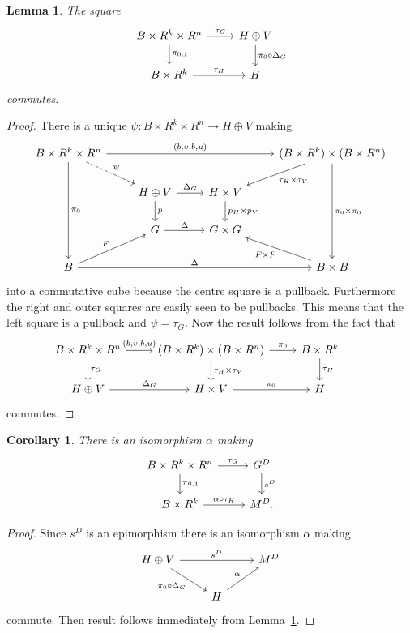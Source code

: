 \documentclass[pdftex]{sigma}
\numberwithin{equation}{section}
\newtheorem{Corollary}[Theorem]{Corollary}
\newtheorem{Lemma}[Theorem]{Lemma}
\begin{document}
\begin{Lemma}\label{lem:split-s}
The square
\begin{equation*}\begin{tikzcd}
B\times R^k \times R^n \rar{\tau_G} \dar{\pi_{0,1}} & H\oplus V \dar{\pi_0\circ\Delta_G}\\
B\times R^k \rar{\tau_H} & H
\end{tikzcd}\end{equation*}
commutes.
\end{Lemma}
\begin{proof}There is a unique $\psi\colon B\times R^k\times R^n\rightarrow H\oplus V$ making
\begin{equation*}
\begin{tikzcd}
B\times R^k\times R^n \arrow{ddd}{\pi_0} \drar[dashed]{\psi} \arrow{rrr}{(b,v,b,u)} &&& (B\times R^k)\times(B\times R^n) \arrow{ddd}{\pi_0\times\pi_0} \dlar{\tau_H\times\tau_V}\\
& H\oplus V \dar{p} \rar{\Delta_G} & H\times V \dar{p_H\times p_V} &\\
& G \rar{\Delta} & G\times G & \\
B \urar{F} \arrow{rrr}{\Delta} &&& B\times B \ular{F\times F}
\end{tikzcd}
\end{equation*}
into a commutative cube because the centre square is a pullback. Furthermore the right and outer squares are easily seen to be pullbacks. This means that the left square is a pullback and $\psi=\tau_G$. Now the result follows from the fact that
\begin{equation*}\begin{tikzcd}
B\times R^k \times R^n \rar{(b,v,b,u)} \dar{\tau_G} & (B\times R^k)\times(B\times R^n) \dar{\tau_H\times \tau_V} \rar{\pi_0} &B\times R^k \dar{\tau_H} &\\
H\oplus V \rar{\Delta_G} & H\times V \rar{\pi_0} & H
\end{tikzcd}\end{equation*}
commutes.
\end{proof}

\begin{Corollary}\label{cor:split-tangent}
There is an isomorphism $\alpha$ making
\begin{equation*}\begin{tikzcd}
B\times R^k\times R^n \rar{\tau_G} \dar{\pi_{0,1}}& G^D \dar{s^D}\\
B\times R^k \rar{\alpha\circ\tau_H} & M^D.
\end{tikzcd}\end{equation*}
\end{Corollary}
\begin{proof}
Since $s^D$ is an epimorphism there is an isomorphism $\alpha$ making
\begin{equation*}\begin{tikzcd}
H\oplus V \arrow{rr}{s^D} \drar[swap]{\pi_0\circ \Delta_G} &&M^D \\
&H \urar{\alpha}&
\end{tikzcd}\end{equation*}
commute. Then result follows immediately from Lemma~\ref{lem:split-s}.
\end{proof}
\end{document}
